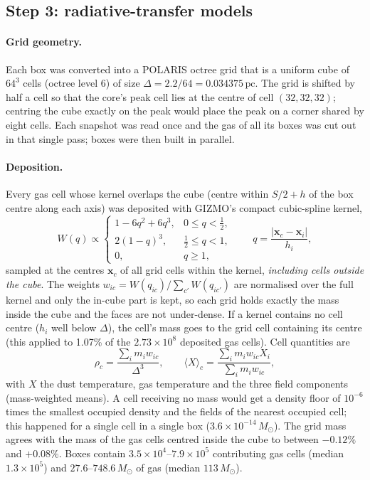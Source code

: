 \subsection{Step 3: radiative-transfer models}
\label{sec:dataset:grids}

\paragraph{Grid geometry.} Each box was converted into a POLARIS octree grid that is a uniform cube of
$64^{3}$ cells (octree level 6) of size $\Delta=2.2/64=0.034375\,\mathrm{pc}$. The grid is shifted by half a
cell so that the core's peak cell lies at the centre of cell $(32,32,32)$; centring the cube exactly on the peak
would place the peak on a corner shared by eight cells. Each snapshot was read once and the gas of all its boxes
was cut out in that single pass; boxes were then built in parallel.

\paragraph{Deposition.} Every gas cell whose kernel overlaps the cube (centre within $S/2+h$ of the box centre
along each axis) was deposited with GIZMO's compact cubic-spline kernel,
\begin{equation}
  W(q) \propto \begin{cases} 1-6q^{2}+6q^{3}, & 0\le q<\tfrac12,\\ 2(1-q)^{3}, & \tfrac12\le q<1,\\ 0, & q\ge 1,\end{cases}
  \qquad q = \frac{|\mathbf{x}_c-\mathbf{x}_i|}{h_i},
\end{equation}
sampled at the centres $\mathbf{x}_c$ of all grid cells within the kernel, \emph{including cells outside the cube}.
The weights $w_{ic}=W(q_{ic})/\sum_{c'}W(q_{ic'})$ are normalised over the full kernel and only the in-cube part
is kept, so each grid holds exactly the mass inside the cube and the faces are not under-dense. If a kernel
contains no cell centre ($h_i$ well below $\Delta$), the cell's mass goes to the grid cell containing its centre
(this applied to 1.07\% of the $2.73\times10^{8}$ deposited gas cells). Cell quantities are
\begin{equation}
  \rho_c = \frac{\sum_i m_i w_{ic}}{\Delta^{3}},\qquad
  \langle X\rangle_c = \frac{\sum_i m_i w_{ic} X_i}{\sum_i m_i w_{ic}},
\end{equation}
with $X$ the dust temperature, gas temperature and the three field components (mass-weighted means). A cell
receiving no mass would get a density floor of $10^{-6}$ times the smallest occupied density and the fields of
the nearest occupied cell; this happened for a single cell in a single box ($3.6\times10^{-14}\,M_\odot$).
The grid mass agrees with the mass of the gas cells centred inside the cube to between $-0.12\%$ and $+0.08\%$.
Boxes contain $3.5\times10^{4}$--$7.9\times10^{5}$ contributing gas cells (median $1.3\times10^{5}$) and
$27.6$--$748.6\,M_\odot$ of gas (median $113\,M_\odot$).

